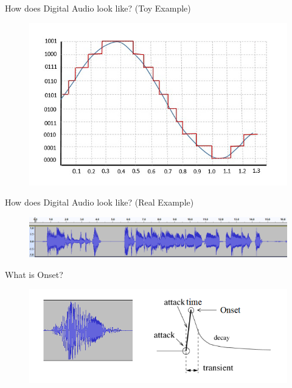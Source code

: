 \documentclass[10pt]{beamer}
\begin{document}
\begin{frame}{How does Digital Audio look like? (Toy Example)}
    \begin{figure}
        \centering
        \includegraphics[width = \textwidth]{fig/quantization.jpg}
    \end{figure}
\end{frame}

\begin{frame}{How does Digital Audio look like? (Real Example)}
    \begin{figure}
        \centering
        \includegraphics[width = \textwidth,trim={0 0 22cm 0},clip]{fig/oscillogram_sa_re_jahan_se_accha.png}
    \end{figure}
\end{frame}

\begin{frame}{What is Onset?}
    \begin{figure}
    \centering
    \includegraphics[width = \textwidth]{fig/onset_defn.png}
    \end{figure}
\end{frame}
\end{document}
